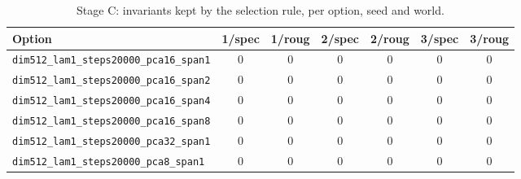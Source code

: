 \begin{table}[t]\centering\small
\caption{Stage C: invariants kept by the selection rule, per option, seed and world.}\label{tab:stageCkept}
\begin{adjustbox}{max width=\linewidth}\begin{tabular}{lcccccc}\toprule
Option & 1/spec & 1/roug & 2/spec & 2/roug & 3/spec & 3/roug\\\midrule
\texttt{dim512\_lam1\_steps20000\_pca16\_span1} & 0 & 0 & 0 & 0 & 0 & 0\\
\texttt{dim512\_lam1\_steps20000\_pca16\_span2} & 0 & 0 & 0 & 0 & 0 & 0\\
\texttt{dim512\_lam1\_steps20000\_pca16\_span4} & 0 & 0 & 0 & 0 & 0 & 0\\
\texttt{dim512\_lam1\_steps20000\_pca16\_span8} & 0 & 0 & 0 & 0 & 0 & 0\\
\texttt{dim512\_lam1\_steps20000\_pca32\_span1} & 0 & 0 & 0 & 0 & 0 & 0\\
\texttt{dim512\_lam1\_steps20000\_pca8\_span1} & 0 & 0 & 0 & 0 & 0 & 0\\
\bottomrule\end{tabular}\end{adjustbox}
\end{table}
